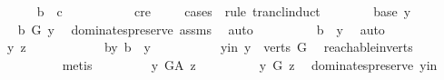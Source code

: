 \begin{isabellebody}
\ \ \ \ \isamarkupfalse%
\ {\isachardoublequoteopen}b\ {\isasymrightarrow}\isactrlsup {\isacharplus}{\kern0pt}\ c{\isachardoublequoteclose}\ \ \ \isanewline
\ \ \ \ \ \ \isamarkupfalse%
\ c{\isacharunderscore}{\kern0pt}re\isanewline
\ \ \ \ \isamarkupfalse%
{\isacharparenleft}{\kern0pt}cases\ \ rule{\isacharcolon}{\kern0pt}\ trancl{\isacharunderscore}{\kern0pt}induct{\isacharparenright}{\kern0pt}\isanewline
\ \ \ \ \ \ \isamarkupfalse%
\ {\isacharparenleft}{\kern0pt}base\ y{\isacharparenright}{\kern0pt}\isanewline
\ \ \ \ \ \ \isamarkupfalse%
\ \isamarkupfalse%
\ {\isachardoublequoteopen}b\ {\isasymrightarrow}\isactrlbsub G\isactrlesub \ y{\isachardoublequoteclose}\ \isamarkupfalse%
\ dominates{\isacharunderscore}{\kern0pt}preserve\ assms{\isacharparenleft}{\kern0pt}{}{\isacharparenright}{\kern0pt}\ \isamarkupfalse%
\ auto\isanewline
\ \ \ \ \ \ \isamarkupfalse%
\ \isamarkupfalse%
\ {\isachardoublequoteopen}b\ {\isasymrightarrow}\isactrlsup {\isacharplus}{\kern0pt}\ y{\isachardoublequoteclose}\ \isamarkupfalse%
\ auto\isanewline
\ \ \ \ \isamarkupfalse%
\isanewline
\ \ \ \ \ \ \isamarkupfalse%
\ y\ z\ \ \ \ \isanewline
\ \ \ \ \ \ \isamarkupfalse%
\ b{\isacharunderscore}{\kern0pt}y{\isacharcolon}{\kern0pt}\ {\isachardoublequoteopen}b\ {\isasymrightarrow}\isactrlsup {\isacharplus}{\kern0pt}\ y{\isachardoublequoteclose}\ \isanewline
\ \ \ \ \ \ \isamarkupfalse%
\ \isamarkupfalse%
\ y{\isacharunderscore}{\kern0pt}in{\isacharcolon}{\kern0pt}\ {\isachardoublequoteopen}y\ {\isasymin}\ verts\ G{\isachardoublequoteclose}\ \isamarkupfalse%
\ reachable{}{\isacharunderscore}{\kern0pt}in{\isacharunderscore}{\kern0pt}verts{\isacharparenleft}{\kern0pt}{}{\isacharparenright}{\kern0pt}\isanewline
\ \ \ \ \ \ \ \ \isamarkupfalse%
\ {\isacharparenleft}{\kern0pt}metis{\isacharparenright}{\kern0pt}\ \isanewline
\ \ \ \ \ \ \isamarkupfalse%
\ {\isachardoublequoteopen}y\ {\isasymrightarrow}\isactrlbsub G{\isacharunderscore}{\kern0pt}A\isactrlesub \ z{\isachardoublequoteclose}\isanewline
\ \ \ \ \ \ \isamarkupfalse%
\ \isamarkupfalse%
\ {\isachardoublequoteopen}y\ {\isasymrightarrow}\isactrlbsub G\isactrlesub \ z{\isachardoublequoteclose}\ \isamarkupfalse%
\ dominates{\isacharunderscore}{\kern0pt}preserve\ y{\isacharunderscore}{\kern0pt}in\ \isamarkupfalse%

\end{isabellebody}

